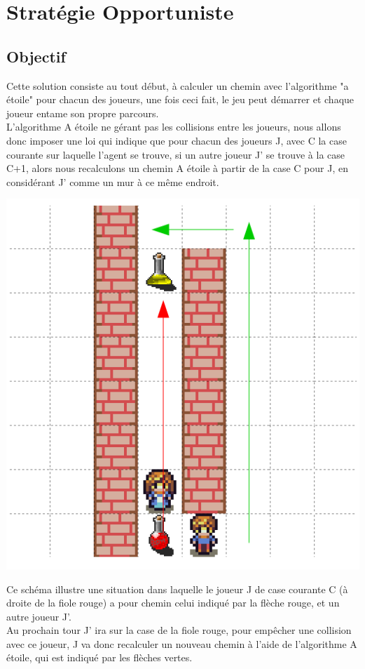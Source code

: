 \documentclass{article}
\begin{document}
\section{Stratégie Opportuniste}
	\subsection{Objectif}
		Cette solution consiste au tout début, à calculer un chemin avec
		l'algorithme "a étoile" pour chacun des joueurs, une fois ceci fait, le jeu peut démarrer et chaque joueur entame son propre parcours.\\ 
L'algorithme A étoile ne gérant pas les collisions entre les joueurs, nous allons donc imposer une loi qui indique que pour chacun des joueurs J, avec C la case courante sur laquelle l'agent se trouve, si un autre joueur J' se trouve à la case C+1, alors nous recalculons un chemin A étoile à partir de la case C pour J, en considérant J' comme un mur à ce même endroit.
\begin{center}
	\includegraphics[scale=0.7]{Solution1_ex}
\end{center}
	Ce schéma illustre une situation dans laquelle le joueur J de case courante C (à droite de la fiole rouge) a pour chemin celui indiqué par la flèche rouge, et un autre joueur J'.\\
	Au prochain tour J' ira sur la case de la fiole rouge, pour empêcher une collision avec ce joueur, J va donc recalculer un nouveau chemin à l'aide de l'algorithme A étoile, qui est indiqué par les flèches vertes.
\end{document}
